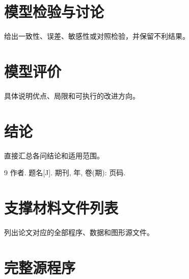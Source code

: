 \documentclass{shumo-cumcm2025}
\begin{document}
\section{模型检验与讨论}
给出一致性、误差、敏感性或对照检验，并保留不利结果。
\section{模型评价}
具体说明优点、局限和可执行的改进方向。
\section{结论}
直接汇总各问结论和适用范围。
\begin{thebibliography}{9}
 作者. 题名[J]. 期刊, 年, 卷(期): 页码.
\end{thebibliography}
\clearpage
\appendix
\section{支撑材料文件列表}
列出论文对应的全部程序、数据和图形源文件。
\section{完整源程序}

\end{document}
